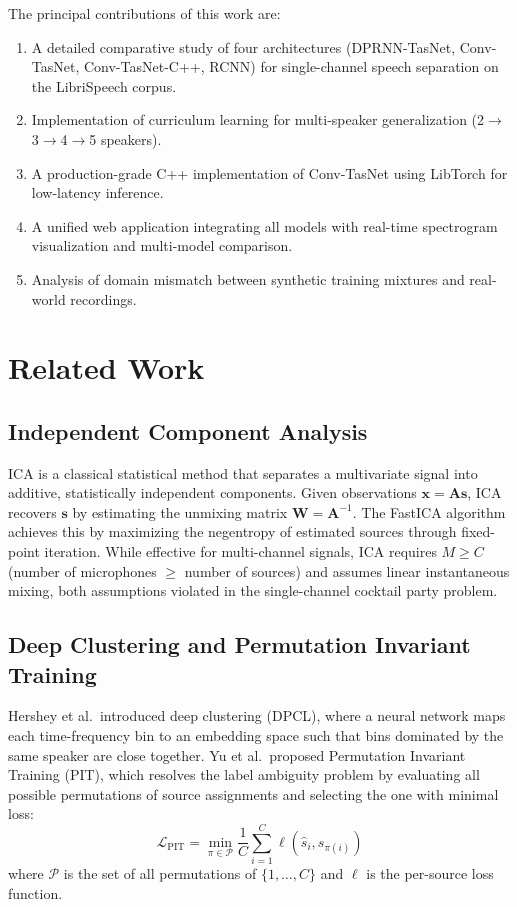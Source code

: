 \documentclass[conference]{IEEEtran}
\begin{document}
The principal contributions of this work are:
\begin{enumerate}[leftmargin=*,nosep]
    \item A detailed comparative study of four architectures (DPRNN-TasNet, Conv-TasNet, Conv-TasNet-C++, RCNN) for single-channel speech separation on the LibriSpeech corpus.
    \item Implementation of curriculum learning for multi-speaker generalization (2$\rightarrow$3$\rightarrow$4$\rightarrow$5 speakers).
    \item A production-grade C++ implementation of Conv-TasNet using LibTorch for low-latency inference.
    \item A unified web application integrating all models with real-time spectrogram visualization and multi-model comparison.
    \item Analysis of domain mismatch between synthetic training mixtures and real-world recordings.
\end{enumerate}

\section{Related Work}
\label{sec:related}

\subsection{Independent Component Analysis}

ICA is a classical statistical method that separates a multivariate signal into additive, statistically independent components. Given observations $\mathbf{x} = \mathbf{A}\mathbf{s}$, ICA recovers $\mathbf{s}$ by estimating the unmixing matrix $\mathbf{W} = \mathbf{A}^{-1}$. The FastICA algorithm achieves this by maximizing the negentropy of estimated sources through fixed-point iteration. While effective for multi-channel signals, ICA requires $M \geq C$ (number of microphones $\geq$ number of sources) and assumes linear instantaneous mixing, both assumptions violated in the single-channel cocktail party problem.

\subsection{Deep Clustering and Permutation Invariant Training}

Hershey et al.\ introduced deep clustering (DPCL), where a neural network maps each time-frequency bin to an embedding space such that bins dominated by the same speaker are close together. Yu et al.\ proposed Permutation Invariant Training (PIT), which resolves the label ambiguity problem by evaluating all possible permutations of source assignments and selecting the one with minimal loss:
\begin{equation}
\mathcal{L}_{\text{PIT}} = \min_{\pi \in \mathcal{P}} \frac{1}{C} \sum_{i=1}^{C} \ell(\hat{s}_i, s_{\pi(i)})
\label{eq:pit}
\end{equation}
where $\mathcal{P}$ is the set of all permutations of $\{1, \ldots, C\}$ and $\ell$ is the per-source loss function.
\end{document}
